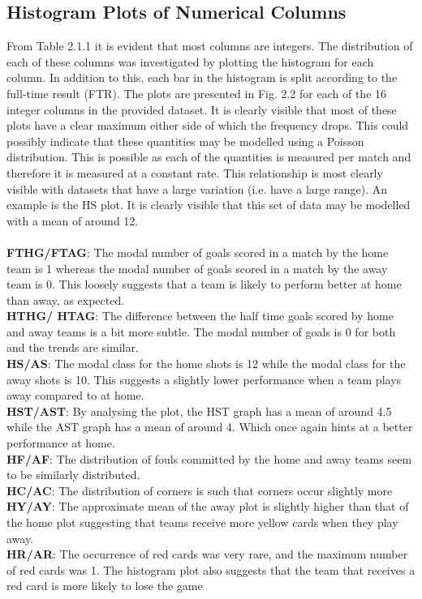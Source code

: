 \documentclass[a4paper,12pt]{article}
\begin{document}
	\subsection{Histogram Plots of Numerical Columns}
	
	From Table 2.1.1 it is evident that most columns are integers. The distribution of each of these columns was investigated by plotting the histogram for each column. In addition to this, each bar in the histogram is split according to the full-time result (FTR). The plots are presented in Fig. 2.2 for each of the 16 integer columns in the provided dataset. It is clearly visible that most of these plots have a clear maximum either side of which the frequency drops. This could possibly indicate that these quantities may be modelled using a Poisson distribution. This is possible as each of the quantities is measured per match and therefore it is measured at a constant rate. This relationship is most clearly visible with datasets that have a large variation (i.e. have a large range). An example is the HS plot. It is clearly visible that this set of data may be modelled with a mean of around 12.\\
	\\
	\textbf{FTHG/FTAG}: The modal number of goals scored in a match by the home team is 1 whereas the modal number of goals scored in a match by the away team is 0. This loosely suggests that a team is likely to perform better at home than away, as expected.\\
	\textbf{HTHG/ HTAG}: The difference between the half time goals scored by home and away teams is a bit more subtle. The modal number of goals is 0 for both and the trends are similar.\\
	\textbf{HS/AS}: The modal class for the home shots is 12 while the modal class for the away shots is 10. This suggests a slightly lower performance when a team plays away compared to at home.\\
	\textbf{HST/AST}: By analysing the plot, the HST graph has a mean of around 4.5 while the AST graph has a mean of around 4. Which once again hints at a better performance at home.\\
	\textbf{HF/AF}: The distribution of fouls committed by the home and away teams seem to be similarly distributed.\\
	\textbf{HC/AC}: The distribution of corners is such that corners occur slightly more \\
	\textbf{HY/AY}: The approximate mean of the away plot is slightly higher than that of the home plot suggesting that teams receive more yellow cards when they play away.\\
	\textbf{HR/AR}: The occurrence of red cards was very rare, and the maximum number of red cards was 1. The histogram plot also suggests that the team that receives a red card is more likely to lose the game
	
\end{document}
